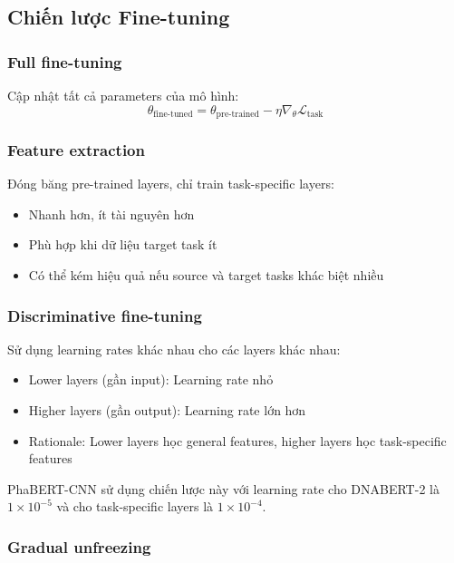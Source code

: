 \subsection{Chiến lược Fine-tuning}

\subsubsection{Full fine-tuning}

Cập nhật tất cả parameters của mô hình:
\begin{equation}
\theta_{\text{fine-tuned}} = \theta_{\text{pre-trained}} - \eta \nabla_\theta \mathcal{L}_{\text{task}}
\end{equation}

\subsubsection{Feature extraction}

Đóng băng pre-trained layers, chỉ train task-specific layers:
\begin{itemize}
    \item Nhanh hơn, ít tài nguyên hơn
    \item Phù hợp khi dữ liệu target task ít
    \item Có thể kém hiệu quả nếu source và target tasks khác biệt nhiều
\end{itemize}

\subsubsection{Discriminative fine-tuning}

Sử dụng learning rates khác nhau cho các layers khác nhau:
\begin{itemize}
    \item Lower layers (gần input): Learning rate nhỏ
    \item Higher layers (gần output): Learning rate lớn hơn
    \item Rationale: Lower layers học general features, higher layers học task-specific features
\end{itemize}

PhaBERT-CNN sử dụng chiến lược này với learning rate cho DNABERT-2 là $1 \times 10^{-5}$ và cho task-specific layers là $1 \times 10^{-4}$.

\subsubsection{Gradual unfreezing}

